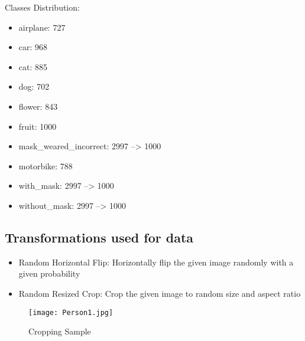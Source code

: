        Classes Distribution:
        \begin{itemize}
            \item airplane: 727
            \item car: 968
            \item cat: 885
            \item dog: 702
            \item flower: 843
            \item fruit: 1000
            \item mask\_weared\_incorrect: 2997 --> 1000
            \item motorbike: 788
            \item with\_mask: 2997 --> 1000
            \item without\_mask: 2997 --> 1000
        \end{itemize}

\subsection{Transformations used for data}
\begin{itemize}
    \item Random Horizontal Flip: Horizontally flip the given image randomly with a given probability
    \item Random Resized Crop: Crop the given image to random size and aspect ratio
\end{itemize}


\begin{figure}[H]
    \centering
    \texttt{[image: Person1.jpg]}
    \caption{Cropping Sample}
    \label{fig:First}
\end{figure}

